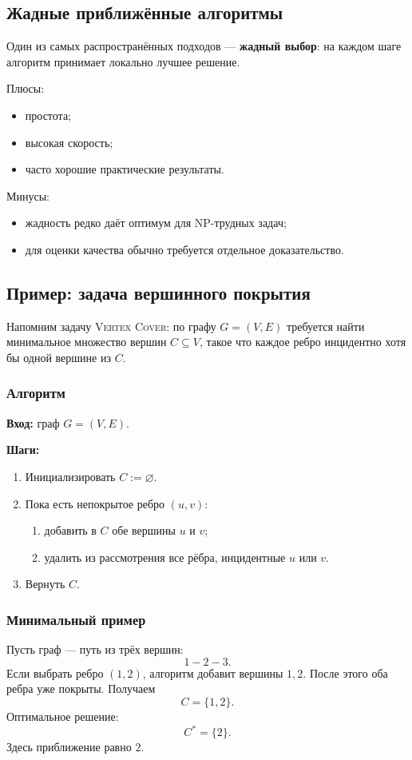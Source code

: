 \documentclass[12pt,a4paper]{article}
\theoremstyle{definition}
\theoremstyle{plain}
\begin{document}
\subsection{Жадные приближённые алгоритмы}
Один из самых распространённых подходов --- \textbf{жадный выбор}: на каждом шаге алгоритм принимает локально лучшее решение.

Плюсы:
\begin{itemize}
\item простота;
\item высокая скорость;
\item часто хорошие практические результаты.
\end{itemize}

Минусы:
\begin{itemize}
\item жадность редко даёт оптимум для NP-трудных задач;
\item для оценки качества обычно требуется отдельное доказательство.
\end{itemize}

\subsection{Пример: задача вершинного покрытия}
Напомним задачу \textsc{Vertex Cover}: по графу $G=(V,E)$ требуется найти минимальное множество вершин $C\subseteq V$, такое что каждое ребро инцидентно хотя бы одной вершине из $C$.

\subsubsection{Алгоритм}
\textbf{Вход:} граф $G=(V,E)$.

\textbf{Шаги:}
\begin{enumerate}
\item Инициализировать $C:=\varnothing$.
\item Пока есть непокрытое ребро $(u,v)$:
\begin{enumerate}
\item добавить в $C$ обе вершины $u$ и $v$;
\item удалить из рассмотрения все рёбра, инцидентные $u$ или $v$.
\end{enumerate}
\item Вернуть $C$.
\end{enumerate}

\subsubsection{Минимальный пример}
Пусть граф --- путь из трёх вершин:
\[
1-2-3.
\]
Если выбрать ребро $(1,2)$, алгоритм добавит вершины $1,2$. После этого оба ребра уже покрыты. Получаем
\[
C=\{1,2\}.
\]
Оптимальное решение:
\[
C^*=\{2\}.
\]
Здесь приближение равно $2$.
\end{document}
